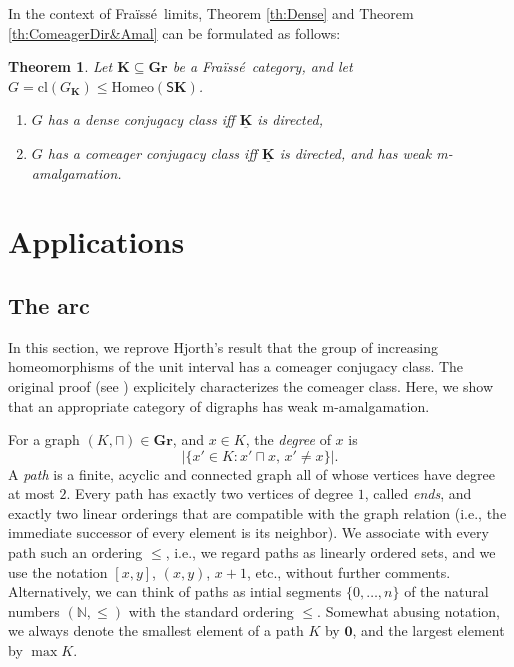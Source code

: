 \documentclass[12pt]{amsart}
\numberwithin{equation}{section}
\theoremstyle{plain}
\newtheorem{theorem}{Theorem}[section]
\theoremstyle{definition}
\newcommand \Homeo{ \mbox{Homeo}}
\newcommand \Sp{{\mathsf{S}}}
\newcommand{\cl}{\mbox{cl}}
\newcommand \rt{\mathbf{0}}
\newcommand \fra{Fra\"{i}ss\'{e}}
\newcommand \GGRb{\mathbf{Gr}}
\newcommand \KKb{\mathbf{K}}
\newcommand \KKub{\underline{\mathbf{K}}}
\newcommand \NN{\mathbb{N}}
\begin{document}
In the context of \fra \ limits, Theorem \ref{th:Dense} and Theorem \ref{th:ComeagerDir&Amal} can be formulated as follows:

\begin{theorem}
\label{th:ConjugacyForFraisse}
	Let $\KKb \subseteq \GGRb$ be a  \fra \ category, and let $G=\cl(G_\KKb) \leq \Homeo(\Sp \KKb)$.
	\begin{enumerate}
	\item  $G$ has a dense conjugacy class iff $\KKub$ is directed,
	\item $G$ has a comeager conjugacy class iff $\KKub$ is directed, and has weak m-amalgamation.
	\end{enumerate}
\end{theorem}

\section{Applications}
\subsection{The arc}
In this section, we reprove Hjorth's result that the group of increasing homeomorphisms of the unit interval has a comeager conjugacy class. The original proof (see \cite[Theorem 4.6]{Hj}) explicitely characterizes the comeager class. Here, we show that an appropriate category of digraphs has weak m-amalgamation.

For a graph $(K,\sqcap) \in \GGRb$, and $x \in K$, the \emph{degree} of $x$ is $$|\{x' \in K: x' \sqcap x, \, x' \neq x\}|.$$ A \emph{path} is a finite, acyclic and connected graph all of whose vertices have degree at most $2$.  Every path has exactly two vertices of degree $1$, called \emph{ends}, and exactly two linear orderings that are compatible with the graph relation (i.e., the immediate successor of every element is its neighbor). We associate with every path such an ordering $\leq$, i.e., we regard paths as linearly ordered sets, and we use the notation $[x,y]$, $(x,y)$, $x+1$, etc., without further comments. Alternatively, we can think of paths as intial segments $\{0,\ldots, n\}$ of the natural numbers $(\NN, \leq)$ with the standard ordering $\leq$. Somewhat abusing notation, we always denote the smallest element of a path $K$ by $\rt$, and the largest element by $\max K$.
\end{document}
